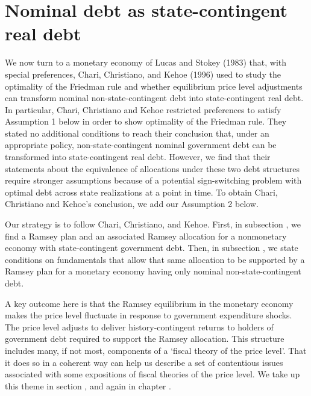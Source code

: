 \section{Nominal debt  as
state-contingent real debt}\label{sec:nom_into_real}%
We now turn to a monetary economy of Lucas and Stokey (1983) that, with special  preferences,
Chari, Christiano, and Kehoe (1996)  used to study the optimality of the
Friedman rule and whether  equilibrium price level adjustments can transform nominal
non-state-contingent debt into state-contingent real debt.
In particular,  Chari, Christiano and Kehoe restricted preferences to satisfy  Assumption 1 below in order to  show optimality of the Friedman rule.
They stated no additional conditions to reach their conclusion that, under an appropriate policy,  non-state-contingent nominal government debt can be transformed into
   state-contingent real debt.  However, we find that their statements about the equivalence of allocations under these two debt structures  require stronger assumptions  because of a potential  sign-switching problem with  optimal debt across state realizations at a point in time. To obtain Chari, Christiano and Kehoe's conclusion,  we add our  Assumption 2 below. %
%
%

Our strategy is to follow Chari, Christiano, and Kehoe.  First, in subsection ,  we find a Ramsey plan and an associated Ramsey allocation for a nonmonetary
economy with state-contingent government debt. Then, in subsection ,  we state   conditions on fundamentals that  allow that  same allocation to  be supported by a Ramsey plan for
a monetary economy having %
 only nominal non-state-contingent debt.

A key outcome here is that the Ramsey equilibrium in the monetary economy makes
the price level fluctuate in response to  government expenditure shocks. The price level adjusts  to deliver history-contingent returns to
holders of government debt required to support the Ramsey allocation.      %
This structure includes many, if not most, components of  a `fiscal theory of the price level'. That it does so in a coherent way  can help us describe a set of contentious
  issues associated with some expositions of fiscal  theories of the price level.   We take up this theme in section , and again in
chapter .
%

